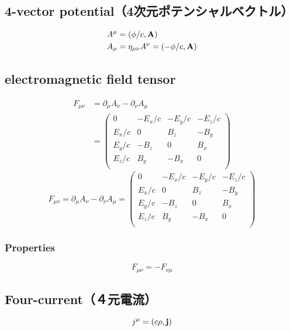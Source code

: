 %
%
\subsection{4-vector potential（4次元ポテンシャルベクトル）}
\begin{align}
  A^{\mu } & = \left( \phi /c , \bf{A} \right)\\
  A_{\mu } & = {\eta }_{\mu \nu } A^{\nu } = \left( - \phi /c , \bf{A} \right)
\end{align}

\subsection{electromagnetic field tensor}
\begin{align}
  F_{\mu \nu }
    & = {\partial}_{\mu } A_{\nu } - {\partial }_{\nu } A_{\mu } \\
    & = \left(
      \begin{array}{cccc}
        0 & -E_x / c & -E_y / c & -E_z / c \\
        E_x / c & 0 & B_z & -B_y \\
        E_y / c & -B_z & 0 & B_x \\
        E_z / c & B_y & -B_x & 0 \\
      \end{array}
    \right)
\end{align}
  \[ F_{\mu \nu }
      = {\partial}_{\mu } A_{\nu } - {\partial }_{\nu } A_{\mu }
      =
        \left(
        \begin{array}{cccc}
          0 & -E_x / c & -E_y / c & -E_z / c \\
          E_x / c & 0 & B_z & -B_y \\
          E_y / c & -B_z & 0 & B_x \\
          E_z / c & B_y & -B_x & 0 \\
        \end{array}
        \right) \]
  \subsubsection{Properties}
    \[ F_{\mu \nu} = - F_{\nu \mu} \]

\subsection{Four-current（４元電流）}
\begin{equation}
  j^\mu = \left( c\rho, \bf{j} \right)
\end{equation}

